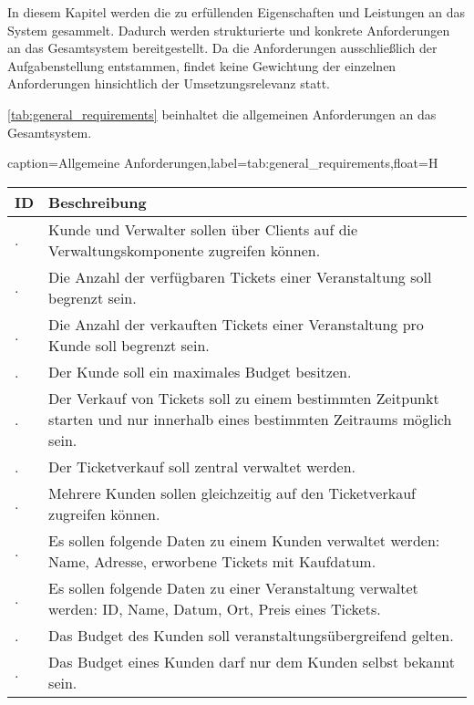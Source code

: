 In diesem Kapitel werden die zu erfüllenden Eigenschaften und Leistungen an das System gesammelt. Dadurch werden strukturierte und konkrete Anforderungen an das Gesamtsystem bereitgestellt.
Da die Anforderungen ausschließlich der Aufgabenstellung entstammen, findet keine Gewichtung der einzelnen Anforderungen hinsichtlich der Umsetzungsrelevanz statt.

\autoref{tab:general_requirements} beinhaltet die allgemeinen Anforderungen an das Gesamtsystem.

\newcommand\inctablenumber{\stepcounter{tablenumber}}
\newcommand\tablenumber{\arabic{tablenumber}}
\newcommand\incrownumber{\stepcounter{rownumber}}
\newcommand\rownumber{\arabic{rownumber}}
\setcounter{tablenumber}{1}
\setcounter{rownumber}{1}
\begin{dhbwtable}{caption={Allgemeine Anforderungen},label=tab:general_requirements,float=H}
    \begin{tabularx}{\textwidth}{l | X}
        \toprule
        \textbf{ID} & \textbf{Beschreibung}  \\\midrule
        \tablenumber .\rownumber & Kunde und Verwalter sollen über Clients auf die Verwaltungskomponente zugreifen können. \\\midrule\incrownumber
        \tablenumber .\rownumber & Die Anzahl der verfügbaren Tickets einer Veranstaltung soll begrenzt sein. \\\midrule\incrownumber
        \tablenumber .\rownumber & Die Anzahl der verkauften Tickets einer Veranstaltung pro Kunde soll begrenzt sein. \\\midrule\incrownumber
        \tablenumber .\rownumber & Der Kunde soll ein maximales Budget besitzen. \\\midrule\incrownumber
        \tablenumber .\rownumber & Der Verkauf von Tickets soll zu einem bestimmten Zeitpunkt starten und nur innerhalb eines bestimmten Zeitraums möglich sein. \\\midrule\incrownumber
        \tablenumber .\rownumber & Der Ticketverkauf soll zentral verwaltet werden. \\\midrule\incrownumber
        \tablenumber .\rownumber & Mehrere Kunden sollen gleichzeitig auf den Ticketverkauf zugreifen können. \\\midrule\incrownumber
        \tablenumber .\rownumber & Es sollen folgende Daten zu einem Kunden verwaltet werden: Name, Adresse, erworbene Tickets mit Kaufdatum. \\\midrule\incrownumber
        \tablenumber .\rownumber & Es sollen folgende Daten zu einer Veranstaltung verwaltet werden: ID, Name, Datum, Ort, Preis eines Tickets. \\\midrule\incrownumber
        \tablenumber .\rownumber & Das Budget des Kunden soll veranstaltungsübergreifend gelten. \\\midrule\incrownumber
        \tablenumber .\rownumber & Das Budget eines Kunden darf nur dem Kunden selbst bekannt sein.  \\\bottomrule
    \end{tabularx}    
\end{dhbwtable}

